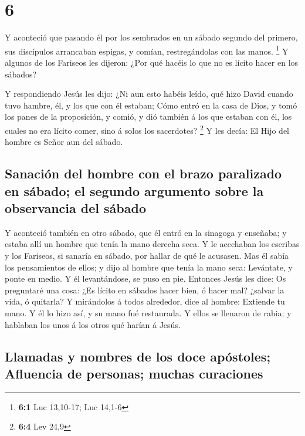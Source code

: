 \hypertarget{section-5}{%
\section{6}\label{section-5}}

 Y aconteció que pasando él por los sembrados en un sábado
segundo del primero, sus discípulos arrancaban espigas, y comían,
restregándolas con las manos. \footnote{\textbf{6:1} Luc 13,10-17; Luc
  14,1-6}  Y algunos de los Fariseos les dijeron: ¿Por qué
hacéis lo que no es lícito hacer en los sábados?

 Y respondiendo Jesús les dijo: ¿Ni aun esto habéis leído,
qué hizo David cuando tuvo hambre, él, y los que con él estaban;
 Cómo entró en la casa de Dios, y tomó los panes de la
proposición, y comió, y dió también á los que estaban con él, los cuales
no era lícito comer, sino á solos los sacerdotes? \footnote{\textbf{6:4}
  Lev 24,9}  Y les decía: El Hijo del hombre es Señor aun
del sábado.

\hypertarget{sanaciuxf3n-del-hombre-con-el-brazo-paralizado-en-suxe1bado-el-segundo-argumento-sobre-la-observancia-del-suxe1bado}{%
\subsection{Sanación del hombre con el brazo paralizado en sábado; el
segundo argumento sobre la observancia del
sábado}\label{sanaciuxf3n-del-hombre-con-el-brazo-paralizado-en-suxe1bado-el-segundo-argumento-sobre-la-observancia-del-suxe1bado}}

 Y aconteció también en otro sábado, que él entró en la
sinagoga y enseñaba; y estaba allí un hombre que tenía la mano derecha
seca.  Y le acechaban los escribas y los Fariseos, si
sanaría en sábado, por hallar de qué le acusasen.  Mas él
sabía los pensamientos de ellos; y dijo al hombre que tenía la mano
seca: Levántate, y ponte en medio. Y él levantándose, se puso en pie.
 Entonces Jesús les dice: Os preguntaré una cosa: ¿Es
lícito en sábados hacer bien, ó hacer mal? ¿salvar la vida, ó quitarla?
 Y mirándolos á todos alrededor, dice al hombre: Extiende
tu mano. Y él lo hizo así, y su mano fué restaurada.  Y
ellos se llenaron de rabia; y hablaban los unos á los otros qué harían á
Jesús.

\hypertarget{llamadas-y-nombres-de-los-doce-apuxf3stoles-afluencia-de-personas-muchas-curaciones}{%
\subsection{Llamadas y nombres de los doce apóstoles; Afluencia de
personas; muchas
curaciones}\label{llamadas-y-nombres-de-los-doce-apuxf3stoles-afluencia-de-personas-muchas-curaciones}}

